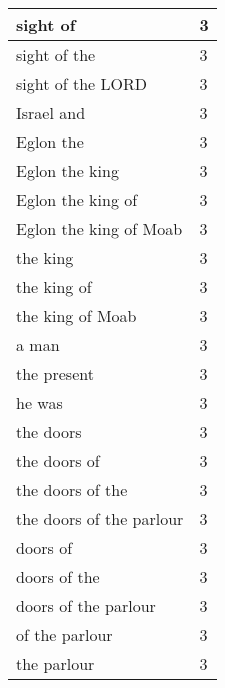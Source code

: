 \begin{center}
\begin{longtable}{|p{3.0in}|p{0.5in}|}
sight of & 3\\ \hline 
sight of the & 3\\ \hline 
sight of the LORD & 3\\ \hline 
Israel and & 3\\ \hline 
Eglon the & 3\\ \hline 
Eglon the king & 3\\ \hline 
Eglon the king of & 3\\ \hline 
Eglon the king of Moab & 3\\ \hline 
the king & 3\\ \hline 
the king of & 3\\ \hline 
the king of Moab & 3\\ \hline 
a man & 3\\ \hline 
the present & 3\\ \hline 
he was & 3\\ \hline 
the doors & 3\\ \hline 
the doors of & 3\\ \hline 
the doors of the & 3\\ \hline 
the doors of the parlour & 3\\ \hline 
doors of & 3\\ \hline 
doors of the & 3\\ \hline 
doors of the parlour & 3\\ \hline 
of the parlour & 3\\ \hline 
the parlour & 3\\ \hline 
\end{longtable}
\end{center}





